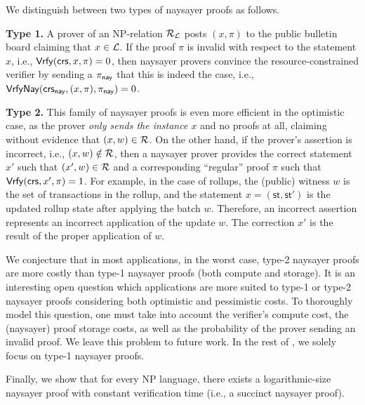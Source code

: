 We distinguish between two types of naysayer proofs as follows.
\begin{description}
    \item \textbf{Type 1.} A prover of an NP-relation $\mathcal{R}_{\mathcal{L}}$ posts $(x,\pi)$ to the public bulletin board claiming that $x \in \mathcal{L}$. If the proof $\pi$ is invalid with respect to the statement $x$, i.e., $\mathsf{Vrfy}(\mathsf{crs}, x,\pi)=0$, then naysayer provers convince the resource-constrained verifier by sending a $\pi_{\mathsf{nay}}$ that this is indeed the case, i.e., ${\mathsf{Vrfy}}\mathsf{Nay}(\mathsf{crs}_{\mathsf{nay}}, (x,\pi), \pi_{\mathsf{nay}})=0$. 
    \item \textbf{Type 2.} This family of naysayer proofs is even more efficient in the optimistic case, as the prover \emph{only sends the instance $x$} and no proofs at all, claiming without evidence that $(x,w) \in \mathcal{R}$. On the other hand, if the prover's assertion is incorrect, i.e., $(x,w) \notin \mathcal{R}$, then a naysayer prover provides the correct statement $x'$ such that $(x',w) \in \mathcal{R}$ 
    and a corresponding ``regular'' proof $\pi$ such that $\mathsf{Vrfy}(\mathsf{crs}, x', \pi) = 1$. For example, in the case of rollups, the (public) witness $w$ is the set of transactions in the rollup, and the statement $x = (\mathsf{st}, \mathsf{st}')$ is the updated rollup state after applying the batch $w$. Therefore, an incorrect assertion represents an incorrect application of the update $w$. The correction $x'$ is the result of the proper application of $w$.
\end{description}
We conjecture that in most applications, in the worst case, type-2 naysayer proofs are more costly than type-1 naysayer proofs (both compute and storage).
It is an interesting open question which applications are more suited to type-1 or type-2 naysayer proofs considering both optimistic and pessimistic costs. To thoroughly model this question, one must take into account the verifier's compute cost, the (naysayer) proof storage costs, as well as the probability of the prover sending an invalid proof. We leave this problem to future work.
In the rest of , we solely focus on type-1 naysayer proofs.

  Finally, we show that for every NP language, there exists a logarithmic-size naysayer proof with constant verification time (i.e., a succinct naysayer proof). %


